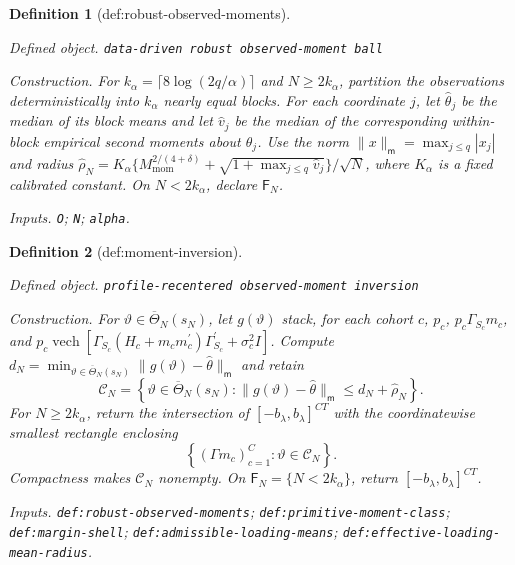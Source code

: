 \documentclass{article}
\newtheorem{definition}{Definition}
\begin{document}
\begin{definition}[def:robust-observed-moments]\label{def:robust-observed-moments}
\par\smallskip\noindent\emph{Defined object.} \texttt{data-\allowbreak{}driven robust observed-\allowbreak{}moment ball}
\par\smallskip\noindent\emph{Construction.} For \(k_\alpha=\lceil8\log(2q/\alpha)\rceil\) and \(N\ge2k_\alpha\), partition the observations deterministically into \(k_\alpha\) nearly equal blocks. For each coordinate \(j\), let \(\widehat\theta_j\) be the median of its block means and let \(\widehat v_j\) be the median of the corresponding within-block empirical second moments about \(\widehat\theta_j\). Use the norm \(\|x\|_{\mathsf m}=\max_{j\le q}|x_j|\) and radius \(\widehat\rho_N=K_\alpha\{M_{\mathrm{mom}}^{2/(4+\delta)}+\sqrt{1+\max_{j\le q}\widehat v_j}\}/\sqrt N\), where \(K_\alpha\) is a fixed calibrated constant. On \(N<2k_\alpha\), declare \(\mathsf F_N\).
\par\smallskip\noindent\emph{Inputs.} \texttt{O}; \texttt{N}; \texttt{alpha}.
\end{definition}

\begin{definition}[def:moment-inversion]\label{def:moment-inversion}
\par\smallskip\noindent\emph{Defined object.} \texttt{profile-\allowbreak{}recentered observed-\allowbreak{}moment inversion}
\par\smallskip\noindent\emph{Construction.} For \(\vartheta\in\overline\Theta_N(s_N)\), let \(g(\vartheta)\) stack, for each cohort \(c\), \(p_c\), \(p_c\Gamma_{S_c}m_c\), and \(p_c\operatorname{vech}[\Gamma_{S_c}(H_c+m_cm_c^{\prime})\Gamma_{S_c}^{\prime}+\sigma_c^2I]\). Compute \(d_N=\min_{\vartheta\in\overline\Theta_N(s_N)}\|g(\vartheta)-\widehat\theta\|_{\mathsf m}\) and retain
\[
\mathcal C_N=\left\{\vartheta\in\overline\Theta_N(s_N):
\|g(\vartheta)-\widehat\theta\|_{\mathsf m}
\le d_N+\widehat\rho_N\right\}.
\]
For \(N\ge2k_\alpha\), return the intersection of \([-b_\lambda,b_\lambda]^{CT}\) with the coordinatewise smallest rectangle enclosing
\[
\left\{(\Gamma m_c)_{c=1}^C:\vartheta\in\mathcal C_N\right\}.
\]
Compactness makes \(\mathcal C_N\) nonempty. On \(\mathsf F_N=\{N<2k_\alpha\}\), return \([-b_\lambda,b_\lambda]^{CT}\).
\par\smallskip\noindent\emph{Inputs.} \texttt{def:\allowbreak{}robust-\allowbreak{}observed-\allowbreak{}moments}; \texttt{def:\allowbreak{}primitive-\allowbreak{}moment-\allowbreak{}class}; \texttt{def:\allowbreak{}margin-\allowbreak{}shell}; \texttt{def:\allowbreak{}admissible-\allowbreak{}loading-\allowbreak{}means}; \texttt{def:\allowbreak{}effective-\allowbreak{}loading-\allowbreak{}mean-\allowbreak{}radius}.
\end{definition}
\end{document}
